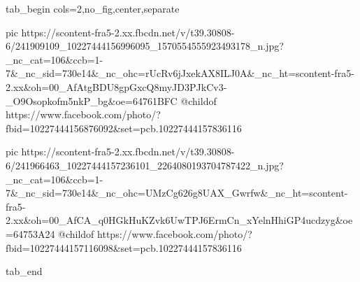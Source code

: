  
 
 
 
 


\ifcmt
  tab_begin cols=2,no_fig,center,separate

     pic https://scontent-fra5-2.xx.fbcdn.net/v/t39.30808-6/241909109_10227444156996095_1570554555923493178_n.jpg?_nc_cat=106&ccb=1-7&_nc_sid=730e14&_nc_ohc=rUcRv6jJxekAX8ILJ0A&_nc_ht=scontent-fra5-2.xx&oh=00_AfAtgBDU8gpGxcQ8myJD3PJkCv3-_O9Osopkofm5nkP_bg&oe=64761BFC
     @childof https://www.facebook.com/photo/?fbid=10227444156876092&set=pcb.10227444157836116

     pic https://scontent-fra5-2.xx.fbcdn.net/v/t39.30808-6/241966463_10227444157236101_2264080193704787422_n.jpg?_nc_cat=106&ccb=1-7&_nc_sid=730e14&_nc_ohc=UMzCg626g8UAX_Gwrfw&_nc_ht=scontent-fra5-2.xx&oh=00_AfCA_q0HGkHuKZvk6UwTPJ6ErmCn_xYelnHhiGP4ucdzyg&oe=64753A24
     @childof https://www.facebook.com/photo/?fbid=10227444157116098&set=pcb.10227444157836116

  tab_end
\fi
